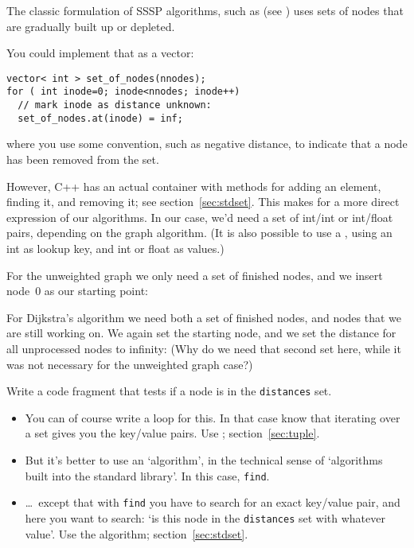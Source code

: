 The classic formulation of \ac{SSSP} algorithms,
such as 
(see )
uses sets of nodes that are gradually built up or depleted.

You could implement that as a vector:
\begin{lstlisting}
vector< int > set_of_nodes(nnodes);
for ( int inode=0; inode<nnodes; inode++)
  // mark inode as distance unknown:
  set_of_nodes.at(inode) = inf;
\end{lstlisting}
where you use some convention, such as negative distance,
to indicate that a node has been removed from the set.

However, C++ has an actual  container with methods
for adding an element, finding it, and removing it; see section~\ref{sec:stdset}.
This makes for a more direct expression of our algorithms.
In our case, we'd need a set of int/int or int/float pairs,
depending on the graph algorithm.
(It is also possible to use a , using an int as lookup key,
and int or float as values.)

For the unweighted graph we only need a set of finished nodes,
and we insert node~0 as our starting point:

For Dijkstra's algorithm we need both a set of finished nodes,
and nodes that we are still working on.
We again set the starting node, and we set the distance
for all unprocessed nodes to infinity:
(Why do we need that second set here, while it was not
necessary for the unweighted graph case?)

\begin{exercise}
  Write a code fragment that tests if a node is in the \lstinline{distances} set.
  \begin{itemize}
  \item You can of course write a loop for this.
    In that case know that iterating over a set gives you the key/value pairs.
    Use ; section~\ref{sec:tuple}.
  \item But it's better to use an `algorithm', in the technical sense of
    `algorithms built into the standard library'. In this case, \lstinline{find}.
  \item \ldots~except that with \lstinline{find} you have to search for an exact
    key/value pair, and here you want to search: `is this node
    in the \lstinline{distances} set with whatever value'.
    Use the  algorithm; section~\ref{sec:stdset}.
  \end{itemize}
\end{exercise}

